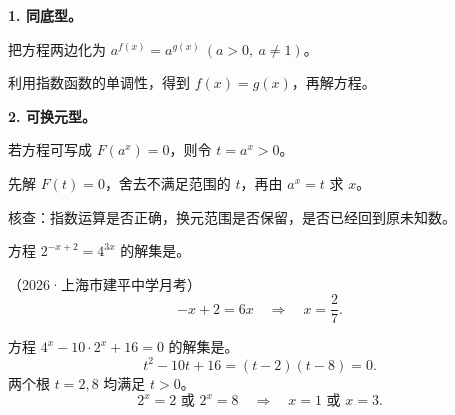 \begin{frame}[t,label=A11m]
  \textbf{1. 同底型。}
  \par 把方程两边化为 $a^{f(x)}=a^{g(x)}\ (a>0,\ a\ne1)$。
  \par 利用指数函数的单调性，得到 $f(x)=g(x)$，再解方程。
  \pause
  \par\vspace{0.45cm}
  \textbf{2. 可换元型。}
  \par 若方程可写成 $F(a^x)=0$，则令 $t=a^x>0$。
  \par 先解 $F(t)=0$，舍去不满足范围的 $t$，再由 $a^x=t$ 求 $x$。
  \par\vspace{0.3cm}
  核查：指数运算是否正确，换元范围是否保留，是否已经回到原未知数。
\end{frame}

\begin{frame}[t,label=AV05q1]
  方程 $2^{-x+2}=4^{3x}$ 的解集是\underline{\hspace{2.3cm}}。
  \par\vspace{0.2cm}（2026·上海市建平中学月考）
  \pause
  \[
    -x+2=6x\quad\Longrightarrow\quad x=\frac27.
  \]
\end{frame}

\begin{frame}[t,label=AV05q2]
  方程 $4^x-10\cdot2^x+16=0$ 的解集是\underline{\hspace{2.3cm}}。
  \pause
  \[
    t^2-10t+16=(t-2)(t-8)=0.
  \]
  两个根 $t=2,8$ 均满足 $t>0$。
  \[
    2^x=2\text{ 或 }2^x=8\quad\Longrightarrow\quad x=1\text{ 或 }x=3.
  \]
\end{frame}


